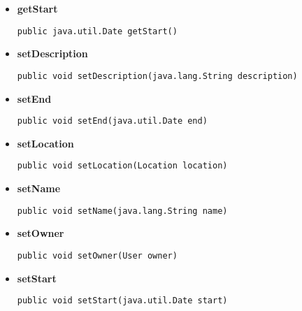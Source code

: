 \documentclass[11pt,a4paper]{report}
\begin{document}
{{{{{{{{{{{{\begin{itemize}
{
\hypertarget{edu.kit.pse17.go_app.GO.getOwner()}{{\bf  getOwner}\\}
\begin{lstlisting}[frame=none]
public User getOwner()\end{lstlisting} %
}%
\item{ 
\hypertarget{edu.kit.pse17.go_app.GO.getStart()}{{\bf  getStart}\\}
\begin{lstlisting}[frame=none]
public java.util.Date getStart()\end{lstlisting} %
}%
\item{ 
\hypertarget{edu.kit.pse17.go_app.GO.setDescription(java.lang.String)}{{\bf  setDescription}\\}
\begin{lstlisting}[frame=none]
public void setDescription(java.lang.String description)\end{lstlisting} %
}%
\item{ 
\hypertarget{edu.kit.pse17.go_app.GO.setEnd(java.util.Date)}{{\bf  setEnd}\\}
\begin{lstlisting}[frame=none]
public void setEnd(java.util.Date end)\end{lstlisting} %
}%
\item{ 
\hypertarget{edu.kit.pse17.go_app.GO.setLocation(Location)}{{\bf  setLocation}\\}
\begin{lstlisting}[frame=none]
public void setLocation(Location location)\end{lstlisting} %
}%
\item{ 
\hypertarget{edu.kit.pse17.go_app.GO.setName(java.lang.String)}{{\bf  setName}\\}
\begin{lstlisting}[frame=none]
public void setName(java.lang.String name)\end{lstlisting} %
}%
\item{ 
\hypertarget{edu.kit.pse17.go_app.GO.setOwner(edu.kit.pse17.go_app.User)}{{\bf  setOwner}\\}
\begin{lstlisting}[frame=none]
public void setOwner(User owner)\end{lstlisting} %
}%
\item{ 
\hypertarget{edu.kit.pse17.go_app.GO.setStart(java.util.Date)}{{\bf  setStart}\\}
\begin{lstlisting}[frame=none]
public void setStart(java.util.Date start)\end{lstlisting} %
}%
\end{itemize}
}
}
}}}}}}}}}}
\end{document}
